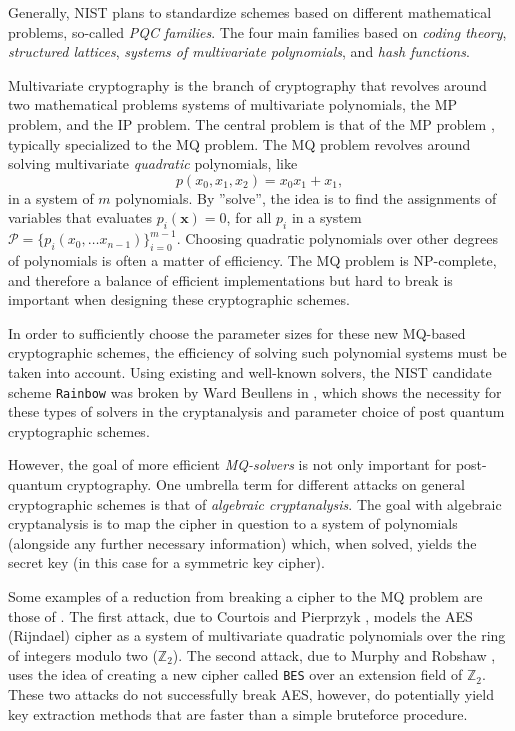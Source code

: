 Generally, NIST plans to standardize schemes based on different mathematical problems, so-called \textit{PQC families}. The four main families based on \textit{coding theory}, \textit{structured lattices}, \textit{systems of multivariate polynomials}, and \textit{hash functions}.

Multivariate cryptography is the branch of cryptography that revolves around two mathematical problems systems of multivariate polynomials, the MP problem, and the IP problem. The central problem is that of the MP problem \cite{ding2020}, typically specialized to the MQ problem. The MQ problem revolves around solving multivariate \textit{quadratic} polynomials, like 
$$
    p(x_0,x_1,x_2) = x_0x_1 + x_1,
$$
in a system of $m$ polynomials. By ''solve'', the idea is to find the assignments of variables that evaluates $p_i(\mathbf{x}) = 0$, for all $p_i$ in a system $\mathcal{P} = \{p_i(x_{0}, \dots x_{n - 1})\}_{i = 0}^{m - 1}$. Choosing quadratic polynomials over other degrees of polynomials is often a matter of efficiency. The MQ problem is NP-complete, and therefore a balance of efficient implementations but hard to break is important when designing these cryptographic schemes.

In order to sufficiently choose the parameter sizes for these new MQ-based cryptographic schemes, the efficiency of solving such polynomial systems must be taken into account. Using existing and well-known solvers, the NIST candidate scheme \texttt{Rainbow} was broken by Ward Beullens in \cite{crypto-2022-32130}, which shows the necessity for these types of solvers in the cryptanalysis and parameter choice of post quantum cryptographic schemes.

However, the goal of more efficient \textit{MQ-solvers} is not only important for post-quantum cryptography. One umbrella term for different attacks on general cryptographic schemes is that of \textit{algebraic cryptanalysis}. The goal with algebraic cryptanalysis is to map the cipher in question to a system of polynomials (alongside any further necessary information) which, when solved, yields the secret key (in this case for a symmetric key cipher).

Some examples of a reduction from breaking a cipher to the MQ problem are those of \cite{nover2005algebraic}. The first attack, due to Courtois and Pierprzyk \cite{courtois2002cryptanalysis}, models the AES (Rijndael) cipher as a system of multivariate quadratic polynomials over the ring of integers modulo two ($\mathbb{Z}_2$). The second attack, due to Murphy and Robshaw \cite{crypto-2002-1565}, uses the idea of creating a new cipher called \texttt{BES} over an extension field of $\mathbb{Z}_2$. These two attacks do not successfully break AES, however, do potentially yield key extraction methods that are faster than a simple bruteforce procedure.

